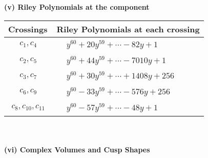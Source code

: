 \documentclass[1p]{elsarticle_modified}
\theoremstyle{definition}
\begin{document}
\newpage\renewcommand{\arraystretch}{1}
\flushleft \textbf{(v) Riley Polynomials at the component}\newline \\
\begin{tabular}{m{50pt}|m{274pt}}
Crossings & \hspace{64pt}Riley Polynomials at each crossing \\
\hline $$\begin{aligned}c_{1},c_{4}\end{aligned}$$&$\begin{aligned}
&y^{60}+20 y^{59}+\cdots-82 y+1
\end{aligned}$\\
\hline $$\begin{aligned}c_{2},c_{5}\end{aligned}$$&$\begin{aligned}
&y^{60}+44 y^{59}+\cdots-7010 y+1
\end{aligned}$\\
\hline $$\begin{aligned}c_{3},c_{7}\end{aligned}$$&$\begin{aligned}
&y^{60}+30 y^{59}+\cdots+1408 y+256
\end{aligned}$\\
\hline $$\begin{aligned}c_{6},c_{9}\end{aligned}$$&$\begin{aligned}
&y^{60}-33 y^{59}+\cdots-576 y+256
\end{aligned}$\\
\hline $$\begin{aligned}c_{8},c_{10},c_{11}\end{aligned}$$&$\begin{aligned}
&y^{60}-57 y^{59}+\cdots-48 y+1
\end{aligned}$\\
\hline
\end{tabular}\\~\\
\newpage\flushleft \textbf{(vi) Complex Volumes and Cusp Shapes}
\end{document}
